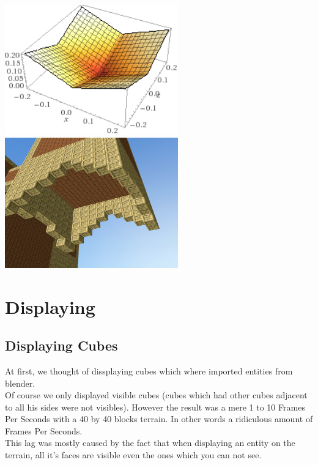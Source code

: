 \documentclass[article]{report}         %
\begin{document}
          \begin{center}
            \includegraphics[width=7.5cm]{images/Abs.png}
            \includegraphics[width=7.5cm]{images/DT/DarkBeard.png} %
          \end{center}
      \section{Displaying}
        \subsection{Displaying Cubes}
          At first, we thought of dissplaying cubes which where imported entities from blender. \\
          Of course we only displayed visible cubes (cubes which had other cubes adjacent to all his sides were not visibles). However the result was a mere 1 to 10 Frames Per Seconds with a 40 by 40 blocks terrain. In other words a ridiculous amount of Frames Per Seconds.\\

          This lag was mostly caused by the fact that when displaying an entity on the terrain, all it's faces are visible even the ones which you can not see.
\end{document}
